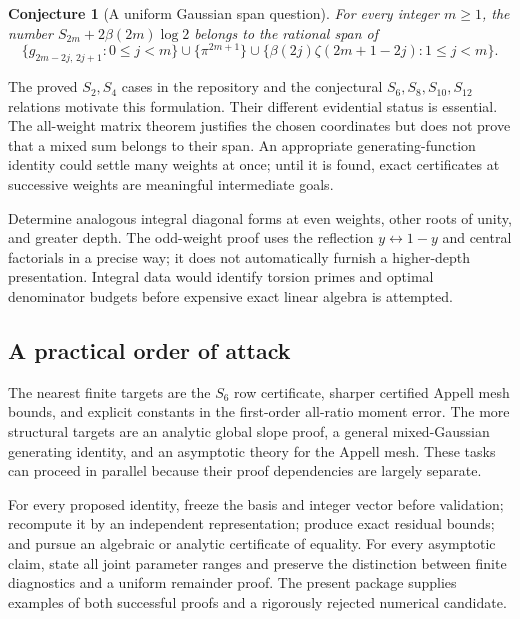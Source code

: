 \documentclass[11pt,letterpaper]{article}
\newtheorem{conjecture}[theorem]{Conjecture}
\theoremstyle{definition}
\theoremstyle{remark}
\begin{document}
\begin{conjecture}[A uniform Gaussian span question]
\label{conj:uniform-span}
For every integer $m\ge1$, the number
$S_{2m}+2\beta(2m)\log2$ belongs to the rational span of
\[
 \{g_{2m-2j,\,2j+1}:0\le j<m\}
 \cup\{\pi^{2m+1}\}
 \cup\{\beta(2j)\zeta(2m+1-2j):1\le j<m\}.
\]
\end{conjecture}

The proved $S_2,S_4$ cases in the repository and the conjectural
$S_6,S_8,S_{10},S_{12}$ relations motivate this formulation. Their
different evidential status is essential. The all-weight matrix theorem
justifies the chosen coordinates but does not prove that a mixed sum
belongs to their span. An appropriate generating-function identity could
settle many weights at once; until it is found, exact certificates at
successive weights are meaningful intermediate goals.

Determine analogous integral diagonal forms at even weights, other roots
of unity, and greater depth. The odd-weight proof uses the reflection
$y\leftrightarrow1-y$ and central factorials in a precise way; it does
not automatically furnish a higher-depth presentation. Integral data
would identify torsion primes and optimal denominator budgets before
expensive exact linear algebra is attempted.

\subsection{A practical order of attack}

The nearest finite targets are the $S_6$ row certificate, sharper
certified Appell mesh bounds, and explicit constants in the first-order
all-ratio moment error. The more structural targets are an analytic
global slope proof, a general mixed-Gaussian generating identity, and
an asymptotic theory for the Appell mesh. These tasks can proceed in
parallel because their proof dependencies are largely separate.

For every proposed identity, freeze the basis and integer vector before
validation; recompute it by an independent representation; produce exact
residual bounds; and pursue an algebraic or analytic certificate of
equality. For every asymptotic claim, state all joint parameter ranges
and preserve the distinction between finite diagnostics and a uniform
remainder proof. The present package supplies examples of both successful
proofs and a rigorously rejected numerical candidate.

\appendix
\end{document}

